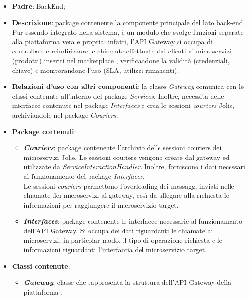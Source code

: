 \begin{itemize}
	\item \textbf{Padre}: BackEnd;
	
	\item \textbf{Descrizione}: package contenente la componente principale del lato back-end. Pur essendo integrato nella sistema, è un modulo che svolge funzioni separate alla piattaforma vera e propria: infatti, l'API Gateway si occupa di controllare e reindirizzare le chiamate effettuate dai clienti ai microservizi (prodotti) inseriti nel marketplace \progetto, verificandone la validità (credenziali, chiave) e monitorandone l'uso (SLA, utilizzi rimanenti).
	
	\item \textbf{Relazioni d'uso con altri componenti}: la classe \textit{Gateway} comunica con le classi contenute all'interno del package \textit{Services}. Inoltre, necessita delle interfacce contenute nel package \textit{Interfaces} e crea le sessioni \textit{couriers} Jolie, archiviandole nel package \textit{Couriers}.
	
	\item \textbf{Package contenuti}:
	\begin{itemize}
		\item \textbf{\textit{Couriers}}: package contenente l'archivio delle sessioni couriers dei microservizi Jolie. Le sessioni couriers vengono create dal gateway ed utilizzate da \textit{ServiceInteractionHandler}. Inoltre, forniscono i dati necessari al funzionamento del package \textit{Interfaces}.\\
		Le sessioni \textit{couriers} permettono l'overloading dei messaggi inviati nelle chiamate dei microservizi al gateway, così da allegare alla richiesta le informazioni per raggiungere il microservizio target.
		
		\item \textbf{\textit{Interfaces}}: package contenente le interfacce necessarie al funzionamento dell'API Gateway. Si occupa dei dati riguardanti le chiamate ai microservizi, in particolar modo, il tipo di operazione richiesta e le informazioni riguardanti l'interfaccia del microservizio target.
	\end{itemize}
	\item \textbf{Classi contenute}:
		\begin{itemize}
			\item \textbf{\textit{Gateway}}: classe che rappresenta la struttura dell'API Gateway della piattaforma \progetto.
		\end{itemize}
\end{itemize}


